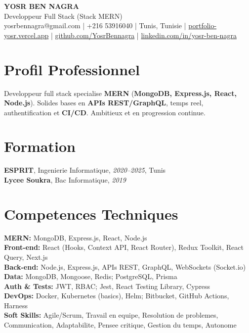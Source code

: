 \documentclass[10pt,a4paper]{article}
\begin{document}
\begin{center}
  {\Large\bfseries YOSR BEN NAGRA}\\[2pt]
  {\small Developpeur Full Stack (Stack MERN)}\\[3pt]
  {\footnotesize yosrbennagra@gmail.com \;|\; +216 53916040 \;|\; Tunis, Tunisie \;|\; \href{https://portfolio-yosr.vercel.app/en}{portfolio-yosr.vercel.app} \;|\; \href{https://github.com/YosrBennagra}{github.com/YosrBennagra} \;|\; \href{https://www.linkedin.com/in/yosr-ben-nagra/}{linkedin.com/in/yosr-ben-nagra}}
\end{center}

\section*{Profil Professionnel}
{\small
Developpeur full stack specialise \textbf{MERN} (\textbf{MongoDB, Express.js, React, Node.js}). Solides bases en \textbf{APIs REST/GraphQL}, temps reel, authentification et \textbf{CI/CD}. Ambitieux et en progression continue.
}

\vspace{4pt}

\section*{Formation}
{\small
\textbf{ESPRIT}, Ingenierie Informatique, \textit{2020--2025}, Tunis\\[1pt]
\textbf{Lycee Soukra}, Bac Informatique, \textit{2019}
}

\vspace{4pt}

\section*{Competences Techniques}
{\small
\textbf{MERN:} MongoDB, Express.js, React, Node.js\\[2pt]
\textbf{Front-end:} React (Hooks, Context API, React Router), Redux Toolkit, React Query, Next.js\\[2pt]
\textbf{Back-end:} Node.js, Express.js, APIs REST, GraphQL, WebSockets (Socket.io)\\[2pt]
\textbf{Data:} MongoDB, Mongoose, Redis; PostgreSQL, Prisma\\[2pt]
\textbf{Auth \& Tests:} JWT, RBAC; Jest, React Testing Library, Cypress\\[2pt]
\textbf{DevOps:} Docker, Kubernetes (basics), Helm; Bitbucket, GitHub Actions, Harness\\[2pt]
\textbf{Soft Skills:} Agile/Scrum, Travail en equipe, Resolution de problemes, Communication, Adaptabilite, Pensee critique, Gestion du temps, Autonome
}
\end{document}
